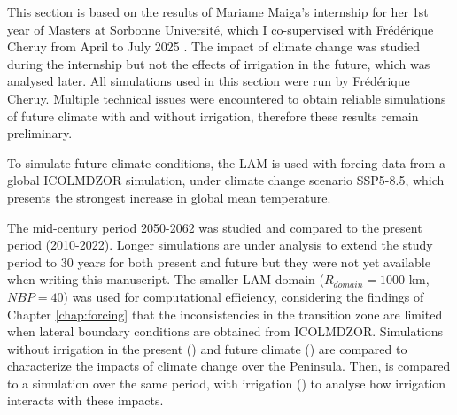 This section is based on the results of Mariame Maiga's internship for her 1st year of Masters at Sorbonne Université, which I co-supervised with Frédérique Cheruy from April to July 2025 \citep{maiga2025}. The impact of climate change was studied during the internship but not the effects of irrigation in the future, which was analysed later. All simulations used in this section were run by Frédérique Cheruy. 
Multiple technical issues were encountered to obtain reliable simulations of future climate with and without irrigation, therefore these results remain preliminary.

\hfill

To simulate future climate conditions, the LAM is used with forcing data from a global ICOLMDZOR simulation, under climate change scenario SSP5-8.5, which presents the strongest increase in global mean temperature. 

The mid-century period 2050-2062 was studied and compared to the present period (2010-2022). Longer simulations are under analysis to extend the study period to 30 years for both present and future but they were not yet available when writing this manuscript.
The smaller LAM domain ($R_{domain} = 1000$ km, $NBP=40$) was used for computational efficiency, considering the findings of Chapter \ref{chap:forcing} that the inconsistencies in the transition zone are limited when lateral boundary conditions are obtained from ICOLMDZOR.
Simulations without irrigation in the present (\presnoirr) and future climate (\futnoirr) are compared to characterize the impacts of climate change over the Peninsula. Then, \futnoirr is compared to a simulation over the same period, with irrigation (\futirr) to analyse how irrigation interacts with these impacts.


